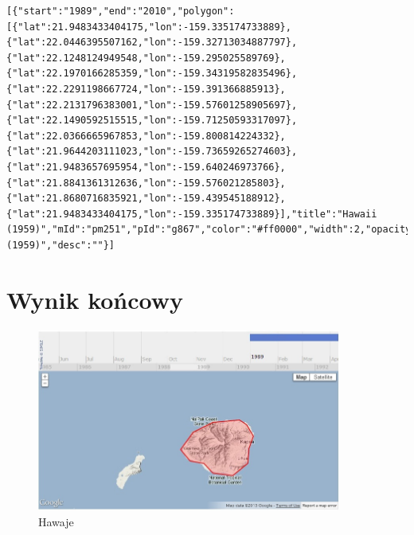 \lstset{language=XML}
\begin{lstlisting}[caption=caption]
[{"start":"1989","end":"2010","polygon":[{"lat":21.9483433404175,"lon":-159.335174733889},{"lat":22.0446395507162,"lon":-159.32713034887797},{"lat":22.1248124949548,"lon":-159.295025589769},{"lat":22.1970166285359,"lon":-159.34319582835496},{"lat":22.2291198667724,"lon":-159.391366885913},{"lat":22.2131796383001,"lon":-159.57601258905697},{"lat":22.1490592515515,"lon":-159.71250593317097},{"lat":22.0366665967853,"lon":-159.800814224332},{"lat":21.9644203111023,"lon":-159.73659265274603},{"lat":21.9483657695954,"lon":-159.640246973766},{"lat":21.8841361312636,"lon":-159.576021285803},{"lat":21.8680716835921,"lon":-159.439545188912},{"lat":21.9483433404175,"lon":-159.335174733889}],"title":"Hawaii (1959)","mId":"pm251","pId":"g867","color":"#ff0000","width":2,"opacity":0.59765625,"fillcolor":"#ff7f7f","name":"Hawaii (1959)","desc":""}]
\end{lstlisting}

\section{Wynik końcowy}
\label{sec:aresult}

\begin{figure}[H]
  \centering
    \includegraphics[width=100mm]{ge/hawaii.jpg}
  \caption{Hawaje}
  \label{fig:hawaii}
\end{figure}